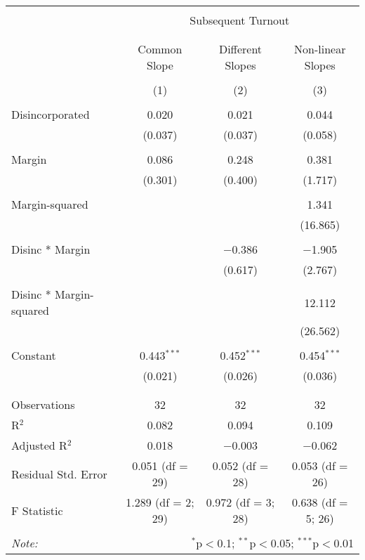 
\begin{table}[!htbp] \centering 
  \caption{} 
  \label{} 
\begin{tabular}{@{\extracolsep{5pt}}lccc} 
\\[-1.8ex]\hline 
\hline \\[-1.8ex] 
 & \multicolumn{3}{c}{Subsequent Turnout} \\ 
\cline{2-4} 
\\[-1.8ex] & \multicolumn{3}{c}{} \\ 
 & Common Slope & Different Slopes & Non-linear Slopes \\ 
\\[-1.8ex] & (1) & (2) & (3)\\ 
\hline \\[-1.8ex] 
 Disincorporated & 0.020 & 0.021 & 0.044 \\ 
  & (0.037) & (0.037) & (0.058) \\ 
  & & & \\ 
 Margin & 0.086 & 0.248 & 0.381 \\ 
  & (0.301) & (0.400) & (1.717) \\ 
  & & & \\ 
 Margin-squared &  &  & 1.341 \\ 
  &  &  & (16.865) \\ 
  & & & \\ 
 Disinc * Margin &  & $-$0.386 & $-$1.905 \\ 
  &  & (0.617) & (2.767) \\ 
  & & & \\ 
 Disinc * Margin-squared &  &  & 12.112 \\ 
  &  &  & (26.562) \\ 
  & & & \\ 
 Constant & 0.443$^{***}$ & 0.452$^{***}$ & 0.454$^{***}$ \\ 
  & (0.021) & (0.026) & (0.036) \\ 
  & & & \\ 
\hline \\[-1.8ex] 
Observations & 32 & 32 & 32 \\ 
R$^{2}$ & 0.082 & 0.094 & 0.109 \\ 
Adjusted R$^{2}$ & 0.018 & $-$0.003 & $-$0.062 \\ 
Residual Std. Error & 0.051 (df = 29) & 0.052 (df = 28) & 0.053 (df = 26) \\ 
F Statistic & 1.289 (df = 2; 29) & 0.972 (df = 3; 28) & 0.638 (df = 5; 26) \\ 
\hline 
\hline \\[-1.8ex] 
\textit{Note:}  & \multicolumn{3}{r}{$^{*}$p$<$0.1; $^{**}$p$<$0.05; $^{***}$p$<$0.01} \\ 
\end{tabular} 
\end{table} 
